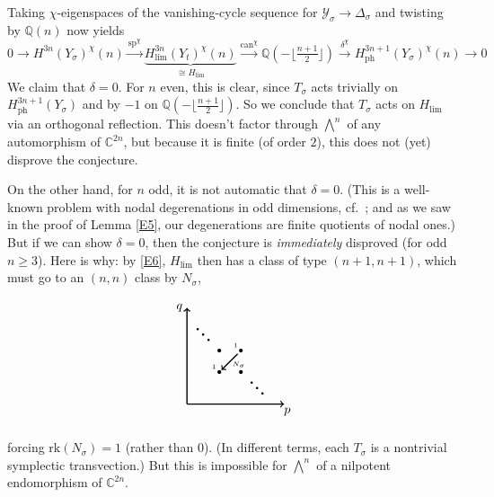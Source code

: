 \documentclass[12pt,letterpaper,english]{amsart}
\numberwithin{equation}{section}
\numberwithin{figure}{section}
\theoremstyle{plain}
\theoremstyle{remark}
\theoremstyle{definition}
\theoremstyle{definition}
\theoremstyle{plain}
\theoremstyle{plain}
\theoremstyle{plain}
\theoremstyle{plain}
\theoremstyle{definition}
\def\QQ{\mathbb{Q}}
\def\CC{\mathbb{C}}
\def\Y{\mathcal{Y}}
\def\Y{\mathcal{Y}}
\def\sp{\mathrm{sp}}
\def\can{\mathrm{can}}
\theoremstyle{definition}
\begin{document}
Taking $\chi$-eigenspaces of the vanishing-cycle sequence for $\Y_{\sigma}\to \Delta_{\sigma}$ and twisting by $\QQ(n)$ now yields\small
\begin{equation}\label{E11}
0\to H^{3n}(Y_{\sigma})^{\chi}(n)\overset{\sp^{\chi}}{\to} \underset{\cong H_{\lim}}{\underbrace{H^{3n}_{\lim}(Y_t)^{\chi}(n)}}\overset{\can^{\chi}}{\to}\QQ(-\lfloor\tfrac{n+1}{2}\rfloor)\overset{\delta^{\chi}}{\to} H^{3n+1}_{\text{ph}}(Y_{\sigma})^{\chi}(n)\to 0	
\end{equation}\normalsize
We claim that $\delta=0$.  For $n$ even, this is clear, since $T_{\sigma}$ acts trivially on $H^{3n+1}_{\text{ph}}(Y_{\sigma})$ and by $-1$ on $\QQ(-\lfloor \tfrac{n+1}{2}\rfloor)$. So we conclude that $T_{\sigma}$ acts on $H_{\lim}$ via an orthogonal reflection. This doesn't factor through $\bigwedge^n$ of any automorphism of $\CC^{2n}$, but because it is finite (of order $2$), this does not (yet) disprove the conjecture.

On the other hand, for $n$ odd, it is not automatic that $\delta=0$. (This is a well-known problem with nodal degerenations in odd dimensions, cf.~\cite[\S2.2]{KL2}; and as we saw in the proof of Lemma \ref{E5}, our degenerations are finite quotients of nodal ones.) But if we can show $\delta=0$, then the conjecture is \emph{immediately} disproved (for odd $n\geq 3$).  Here is why: by \eqref{E6}, $H_{\lim}$ then has a class of type $(n+1,n+1)$, which must go to an $(n,n)$ class by $N_{\sigma}$,
\begin{center}
\begin{equation*}
	\begin{tikzpicture}[scale=0.3]
   	\node at (3.8,2.7) (foo) {\tiny$N_{\sigma}$};
    \draw[->,line width=1.0pt] (-1,-1) -- (-1,8);
    \draw[->,line width=1.0pt] (-1,-1) -- (8,-1);
    \draw[->,line width=1.0pt] (3.7, 3.7) -- (2.2,2.2);
	\fill (4,2) circle (5pt);
	\fill (2,4) circle (5pt);	
	\node at (1.5,2.5) {\tiny$1$};
	\fill (2,2) circle (5pt);
	\fill (4,4) circle (5pt);
	\node at (3.5,4.5) {\tiny$1$};
	\node at (8.3,-1.7) {$p$};
	\node at (-1.7,8) {$q$};
	\fill (1,5) circle (3pt);
	\fill (0.5,5.5) circle (3pt);
	\fill (0,6) circle (3pt);
	\fill (5,1) circle (3pt);
	\fill (5.5,0.5) circle (3pt);
	\fill (6,0) circle (3pt);
\end{tikzpicture}
\end{equation*}
\end{center}
forcing $\mathrm{rk}(N_{\sigma})=1$ (rather than $0$). (In different terms, each $T_{\sigma}$ is a nontrivial symplectic transvection.) But this is impossible for $\bigwedge^n$ of a nilpotent endomorphism of $\CC^{2n}$.
\end{document}

